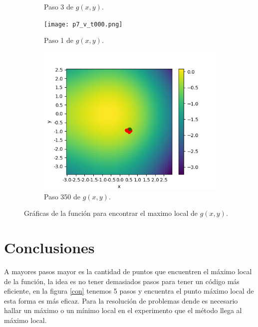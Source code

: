 \documentclass{article}
\begin{document}
\begin{figure} [h!]
\begin{subfigure}[b]{0.40\linewidth}
 		 \caption{Paso 3 de $g(x,y)$.}
 		\label{levelplot}
 	\end{subfigure}
 	 	\begin{subfigure}[b]{0.40\linewidth}
 		\texttt{[image: p7\_v\_t000.png]}
 		 \caption{Paso 1 de $g(x,y)$.}
 		\label{levelplot}
 	\end{subfigure}
 	\begin{subfigure}[b]{0.40\linewidth}
 		\includegraphics[width=\linewidth]{p7_v_t368.png}
 		 \caption{Paso 350 de $g(x,y)$.}
 		\label{levelplot}
 	\end{subfigure}
 	\caption{Gráficas de la función para encontrar el maximo local de $g(x,y)$.}  	
\label{graficas}
 \end{figure}
 
\section{Conclusiones} 

A mayores pasos mayor es la cantidad de puntos que encuentren el máximo local de la función, la idea es no tener demasiados pasos para tener un código más eficiente, en la figura \ref{con} tenemos 5 pasos y encuentra el punto máximo local de esta forma es más eficaz. Para la resolución de problemas dende es necesario hallar un máximo o un mínimo local en el experimento que el método llega al máximo local.
\end{document}
